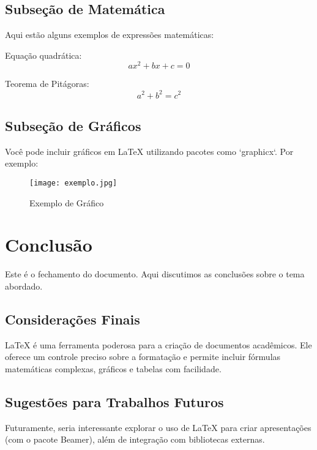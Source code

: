 \documentclass[a4paper,12pt]{article}  %
\begin{document}
\subsection{Subseção de Matemática}  %
Aqui estão alguns exemplos de expressões matemáticas:

Equação quadrática: 
\[
ax^2 + bx + c = 0
\]

Teorema de Pitágoras:
\[
a^2 + b^2 = c^2
\]

\subsection{Subseção de Gráficos}  %
Você pode incluir gráficos em LaTeX utilizando pacotes como `graphicx`. Por exemplo:

\begin{figure}[h]
    \centering
    \texttt{[image: exemplo.jpg]}
    \caption{Exemplo de Gráfico}
    \label{fig:grafico}
\end{figure}

\section{Conclusão}  %
Este é o fechamento do documento. Aqui discutimos as conclusões sobre o tema abordado.

\subsection{Considerações Finais}  %
LaTeX é uma ferramenta poderosa para a criação de documentos acadêmicos. Ele oferece um controle preciso sobre a formatação e permite incluir fórmulas matemáticas complexas, gráficos e tabelas com facilidade.

\subsection{Sugestões para Trabalhos Futuros}  %
Futuramente, seria interessante explorar o uso de LaTeX para criar apresentações (com o pacote Beamer), além de integração com bibliotecas externas.
\end{document}

